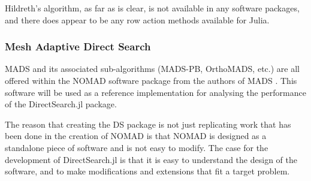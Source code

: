 Hildreth's algorithm, as far as is clear, is not available in any software packages, and there does appear to be any row action methods available for Julia.

\subsubsection{Mesh Adaptive Direct Search}
\ac{MADS} and its associated sub-algorithms (\ac{MADS-PB}, \ac{OrthoMADS}, etc.) are all offered within the NOMAD software package from the authors of \ac{MADS} \cite{LeDigabel2011AlgorithmAlgorithm}. This software will be used as a reference implementation for analysing the performance of the DirectSearch.jl package. 

The reason that creating the \ac{DS} package is not just replicating work that has been done in the creation of NOMAD is that NOMAD is designed as a standalone piece of software and is not easy to modify. The case for the development of DirectSearch.jl is that it is easy to understand the design of the software, and to make modifications and extensions that fit a target problem. 

